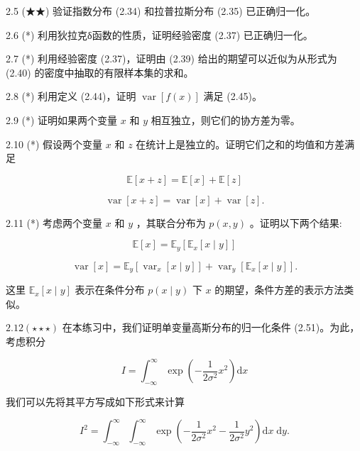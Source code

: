 \documentclass[10pt]{article}
\begin{document}
2.5 (★★) 验证指数分布 (2.34) 和拉普拉斯分布 (2.35) 已正确归一化。

2.6 (*) 利用狄拉克δ函数的性质，证明经验密度 (2.37) 已正确归一化。

2.7 (*) 利用经验密度 (2.37)，证明由 (2.39) 给出的期望可以近似为从形式为 (2.40) 的密度中抽取的有限样本集的求和。

2.8 (*) 利用定义 (2.44)，证明 \(\operatorname{var}\left\lbrack  {f\left( x\right) }\right\rbrack\) 满足 (2.45)。

2.9 (*) 证明如果两个变量 \(x\) 和 \(y\) 相互独立，则它们的协方差为零。

2.10 (*) 假设两个变量 \(x\) 和 \(z\) 在统计上是独立的。证明它们之和的均值和方差满足

\[
\mathbb{E}\left\lbrack  {x + z}\right\rbrack   = \mathbb{E}\left\lbrack  x\right\rbrack   + \mathbb{E}\left\lbrack  z\right\rbrack   \tag{2.120}
\]

\[
\operatorname{var}\left\lbrack  {x + z}\right\rbrack   = \operatorname{var}\left\lbrack  x\right\rbrack   + \operatorname{var}\left\lbrack  z\right\rbrack  . \tag{2.121}
\]

2.11 (*) 考虑两个变量 \(x\) 和 \(y\) ，其联合分布为 \(p\left( {x,y}\right)\) 。证明以下两个结果:

\[
\mathbb{E}\left\lbrack  x\right\rbrack   = {\mathbb{E}}_{y}\left\lbrack  {{\mathbb{E}}_{x}\left\lbrack  {x \mid  y}\right\rbrack  }\right\rbrack   \tag{2.122}
\]

\[
\operatorname{var}\left\lbrack  x\right\rbrack   = {\mathbb{E}}_{y}\left\lbrack  {{\operatorname{var}}_{x}\left\lbrack  {x \mid  y}\right\rbrack  }\right\rbrack   + {\operatorname{var}}_{y}\left\lbrack  {{\mathbb{E}}_{x}\left\lbrack  {x \mid  y}\right\rbrack  }\right\rbrack  . \tag{2.123}
\]

这里 \({\mathbb{E}}_{x}\left\lbrack  {x \mid  y}\right\rbrack\) 表示在条件分布 \(p\left( {x \mid  y}\right)\) 下 \(x\) 的期望，条件方差的表示方法类似。

\({2.12}\left( {\star  \star   \star  }\right)\) 在本练习中，我们证明单变量高斯分布的归一化条件 (2.51)。为此，考虑积分

\[
I = {\int }_{-\infty }^{\infty }\exp \left( {-\frac{1}{2{\sigma }^{2}}{x}^{2}}\right) \mathrm{d}x \tag{2.124}
\]

我们可以先将其平方写成如下形式来计算

\[
{I}^{2} = {\int }_{-\infty }^{\infty }{\int }_{-\infty }^{\infty }\exp \left( {-\frac{1}{2{\sigma }^{2}}{x}^{2} - \frac{1}{2{\sigma }^{2}}{y}^{2}}\right) \mathrm{d}x\mathrm{\;d}y. \tag{2.125}
\]
\end{document}

